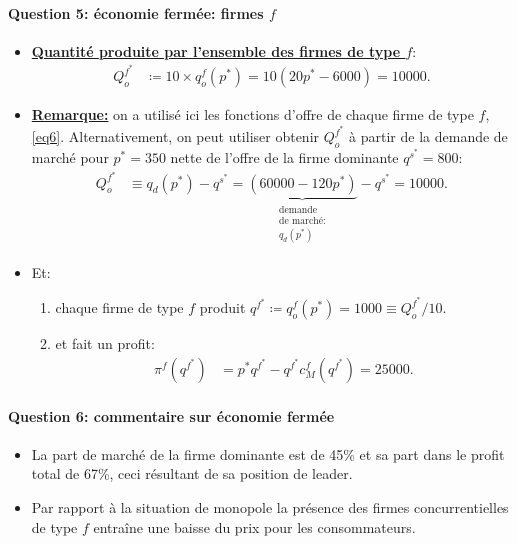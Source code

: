   \begin{frame}[allowframebreaks]{\insertsection}
   \framesubtitle{Question 5: économie fermée: firmes $f$}
  \begin{itemize}
  \item \underline{\textbf{Quantité produite par l'ensemble des firmes de type $f$}}:
  \begin{align*}
  Q^{f^*}_o &\coloneqq 10\times q^f_o(p^*) = 10(20p^* - 6000) = 10000.
  \end{align*}
  \item \underline{\textbf{Remarque:}} on a utilisé ici les fonctions d'offre de chaque firme de type $f$, \eqref{eq6}. Alternativement, on peut utiliser
  obtenir $Q^{f^*}_o$ à partir de la demande de marché pour $p^* = 350$ nette de l'offre de la firme dominante $q^{s^*} = 800$:
  \begin{align*}
   Q^{f^*}_o &\equiv q_d(p^*) - q^{s^*}= \underbrace{(60000 - 120p^*)}_{\substack{\text{demande} \\ \text{de marché:} \\ q_d(p^*) }} - q^{s^*} = 10000.
  \end{align*}
  \item Et:
  \begin{enumerate}[$\cdot$]
  \item chaque firme de type $f$ produit $q^{f^*} \coloneqq q_o^f(p^*) = 1000 \equiv Q^{f^*}_o/10$.
  \item et fait un profit:
  \begin{align*}
  \pi^f(q^{f^*}) &= p^*q^{f^*} - q^{f^*} c_M^f(q^{f^*})  = 25000.
  \end{align*}
  \end{enumerate}
  \end{itemize}
  \end{frame}
  
  \begin{frame}[allowframebreaks]{\insertsection}
   \framesubtitle{Question 6: commentaire sur  économie fermée}
  \begin{itemize}
  \item La part de marché de la firme dominante est de 45\% et sa part dans le profit total de 67\%, ceci résultant de sa position de leader.
  \item Par rapport à la situation de monopole la présence des firmes concurrentielles de type $f$ entraîne une baisse du prix pour les consommateurs.
    \end{itemize}
  \end{frame}
  

